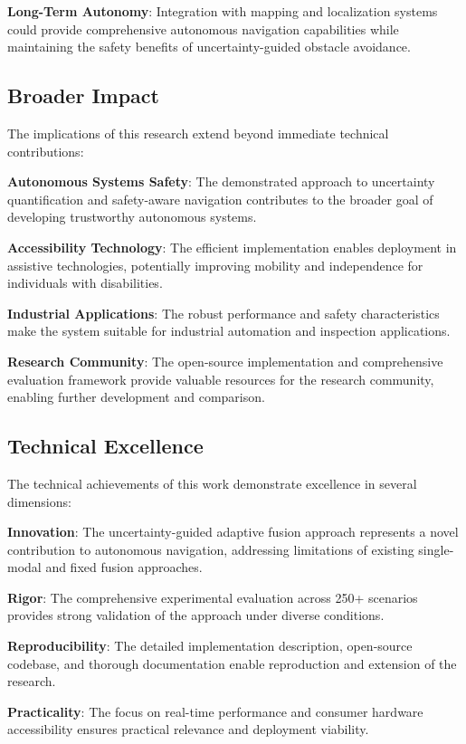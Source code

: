 \documentclass[10pt]{article}
\begin{document}
\textbf{Long-Term Autonomy}: Integration with mapping and localization systems could provide comprehensive autonomous navigation capabilities while maintaining the safety benefits of uncertainty-guided obstacle avoidance.

\subsection{Broader Impact}

The implications of this research extend beyond immediate technical contributions:

\textbf{Autonomous Systems Safety}: The demonstrated approach to uncertainty quantification and safety-aware navigation contributes to the broader goal of developing trustworthy autonomous systems.

\textbf{Accessibility Technology}: The efficient implementation enables deployment in assistive technologies, potentially improving mobility and independence for individuals with disabilities.

\textbf{Industrial Applications}: The robust performance and safety characteristics make the system suitable for industrial automation and inspection applications.

\textbf{Research Community}: The open-source implementation and comprehensive evaluation framework provide valuable resources for the research community, enabling further development and comparison.

\subsection{Technical Excellence}

The technical achievements of this work demonstrate excellence in several dimensions:

\textbf{Innovation}: The uncertainty-guided adaptive fusion approach represents a novel contribution to autonomous navigation, addressing limitations of existing single-modal and fixed fusion approaches.

\textbf{Rigor}: The comprehensive experimental evaluation across 250+ scenarios provides strong validation of the approach under diverse conditions.

\textbf{Reproducibility}: The detailed implementation description, open-source codebase, and thorough documentation enable reproduction and extension of the research.

\textbf{Practicality}: The focus on real-time performance and consumer hardware accessibility ensures practical relevance and deployment viability.
\end{document}
